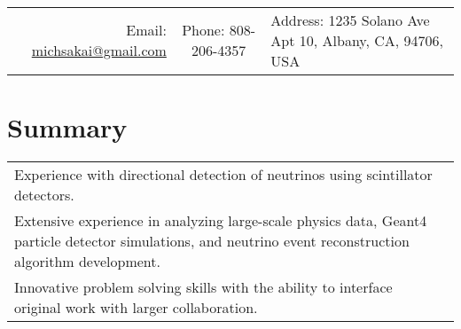 \documentclass[11pt]{article} %
\begin{document}
\setlength{\parskip}{\baselineskip}%



\begin{center}
	\\%
	\noindent\begin{tabular}{r @{$\quad\textbullet\quad$} c @{$\quad\textbullet\quad$} l}
		\small{Email: \href{mailto:michsakai@gmail.com}{michsakai@gmail.com}} & \small{Phone: 808-206-4357} & \small{Address: 1235 Solano Ave Apt 10, Albany, CA, 94706, USA}
	\end{tabular}
\end{center}



%


\section{Summary}
\noindent\begin{tabularx}{\linewidth}{@{{}\textbullet\enskip}X@{\quad}r@{}}
	Experience with directional detection of neutrinos using scintillator
	detectors. & \\
	Extensive experience in analyzing large-scale physics data, Geant4 particle
	detector simulations, and neutrino event reconstruction algorithm
	development. & \\
	Innovative problem solving skills with the ability to interface original
	work with larger collaboration. & \\
\end{tabularx}
\end{document}
